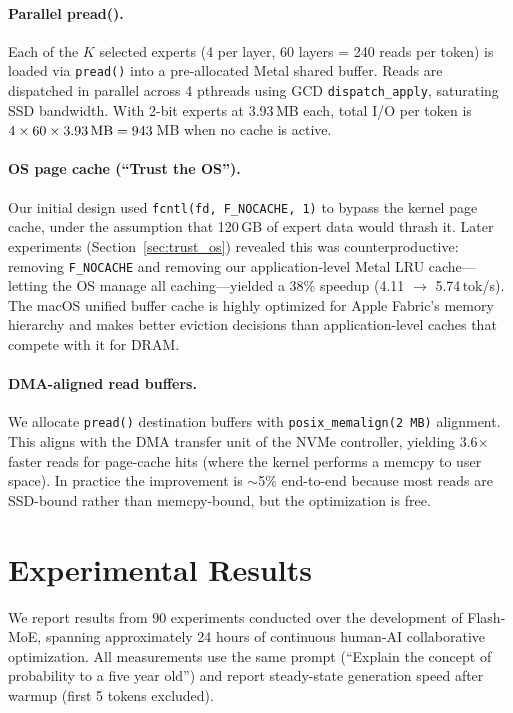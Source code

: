 \documentclass[11pt,twocolumn]{article}
\begin{document}
\paragraph{Parallel pread().}
Each of the $K$ selected experts (4 per layer, 60 layers = 240 reads per token) is loaded via \texttt{pread()} into a pre-allocated Metal shared buffer.
Reads are dispatched in parallel across 4 pthreads using GCD \texttt{dispatch\_apply}, saturating SSD bandwidth.
With 2-bit experts at 3.93\,MB each, total I/O per token is $4 \times 60 \times 3.93\text{\,MB} = 943$\,MB when no cache is active.

\paragraph{OS page cache (``Trust the OS'').}
Our initial design used \texttt{fcntl(fd, F\_NOCACHE, 1)} to bypass the kernel page cache, under the assumption that 120\,GB of expert data would thrash it.
Later experiments (Section~\ref{sec:trust_os}) revealed this was counterproductive: removing \texttt{F\_NOCACHE} and removing our application-level Metal LRU cache---letting the OS manage all caching---yielded a 38\% speedup (4.11 $\to$ 5.74\,tok/s).
The macOS unified buffer cache is highly optimized for Apple Fabric's memory hierarchy and makes better eviction decisions than application-level caches that compete with it for DRAM.

\paragraph{DMA-aligned read buffers.}
We allocate \texttt{pread()} destination buffers with \texttt{posix\_memalign(2\,MB)} alignment.
This aligns with the DMA transfer unit of the NVMe controller, yielding 3.6$\times$ faster reads for page-cache hits (where the kernel performs a memcpy to user space).
In practice the improvement is $\sim$5\% end-to-end because most reads are SSD-bound rather than memcpy-bound, but the optimization is free.

\section{Experimental Results}
\label{sec:results}

We report results from 90 experiments conducted over the development of Flash-MoE, spanning approximately 24 hours of continuous human-AI collaborative optimization.
All measurements use the same prompt (``Explain the concept of probability to a five year old'') and report steady-state generation speed after warmup (first 5 tokens excluded).
\end{document}
